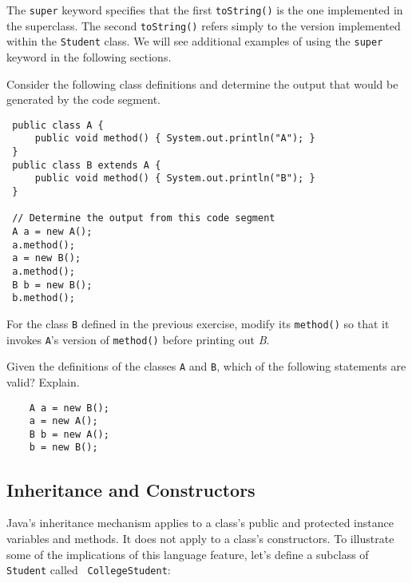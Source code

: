 \noindent The {\tt super} keyword specifies that the first
{\tt toString()} is the one implemented in the superclass.  The second
{\tt toString()} refers simply to the version implemented within the
{\tt Student} class.  We will see additional examples of using the
{\tt super} keyword in the following sections.

\begin{SSTUDY}

\item  Consider the following class definitions and determine the
output that would be generated by the code segment.

\begin{jjjlisting}
\begin{lstlisting}
 public class A {
     public void method() { System.out.println("A"); }
 }
 public class B extends A {
     public void method() { System.out.println("B"); }
 }

 // Determine the output from this code segment
 A a = new A();
 a.method();
 a = new B();
 a.method();
 B b = new B();
 b.method();
\end{lstlisting}
\end{jjjlisting}

\item  For the class {\tt B} defined in the previous exercise,
modify its {\tt method()} so that it invokes {\tt A}'s version
of {\tt method()} before printing out {\em B}.

\item  Given the definitions of the classes {\tt A} and {\tt B},
which of the following statements are valid? Explain.

\begin{jjjlisting}
\begin{lstlisting}
    A a = new B();
    a = new A();
    B b = new A();
    b = new B();
\end{lstlisting}
\end{jjjlisting}


\end{SSTUDY}

\subsection{Inheritance and Constructors}

Java's inheritance mechanism applies to a class's public and protected
instance variables and methods. It does not apply to a class's
constructors. To illustrate some of the implications of this language
feature, let's define a subclass of {\tt Student} called {\tt
CollegeStudent}:

